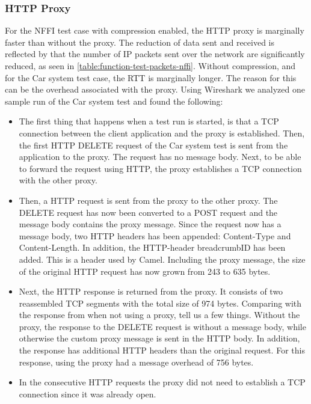 \subsubsection{HTTP Proxy}

For the NFFI test case with compression enabled, the HTTP proxy is marginally
faster than without the proxy. The reduction of data sent and received is
reflected by that the number of IP packets sent over the network are
significantly reduced, as seen in \cref{table:function-test-packets-nffi}.
Without compression, and for the Car system test case, the RTT is marginally
longer. The reason for this can be the overhead associated with the proxy. Using
Wireshark we analyzed one sample run of the Car system test and found the
following:

\begin{itemize}

	\item The first thing that happens when a test run is started, is that a TCP
	connection between the client application and the proxy is established. Then,
	the first HTTP DELETE request of the Car system test is sent from the
	application to the proxy. The request has no message body. Next, to be able to
	forward the request using HTTP, the proxy establishes a TCP connection with the
	other proxy.

	\item Then, a HTTP request is sent from the proxy to the other proxy. The
	DELETE request has now been converted to a POST request and the message
	body contains the proxy message. Since the request now has a message body,
	two HTTP headers has been appended: Content-Type and Content-Length. In
	addition, the HTTP-header breadcrumbID has been added. This is a header used
	by Camel. Including the proxy message, the size of the original HTTP request
	has now grown from 243 to 635 bytes.

	\item Next, the HTTP response is returned from the proxy. It consists of two
	reassembled TCP segments with the total size of 974  bytes. Comparing with the
	response from when not using a proxy, tell us a few things. Without the proxy,
	the response to the DELETE request is without a message body, while otherwise
	the custom proxy message is sent in the HTTP body. In addition, the response
	has additional HTTP headers than the original request. For this response, using
	the proxy had a message overhead of 756 bytes.

    \item In the consecutive HTTP requests the proxy did not need to establish a
    TCP connection since it was already open.

  \end{itemize}

